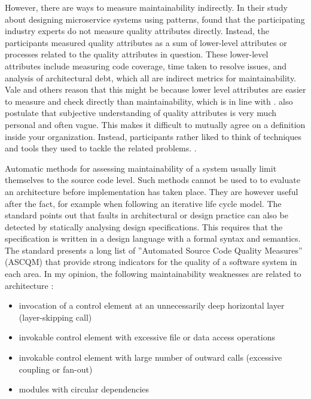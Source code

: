 \documentclass[utf8,english]{gradu3}
\begin{document}
However, there are ways to measure maintainability indirectly. In their study about
designing microservice systems using patterns, \textcite[9]{Vale2022} found that
the participating industry experts do not measure quality attributes directly.
Instead, the participants measured quality attributes as a sum of lower-level attributes or
processes related to the quality attributes in question. These lower-level
attributes include measuring code coverage, time taken to resolve issues, and
analysis of architectural debt, which all are indirect metrics for
maintainability. Vale and others reason that this might be because lower level
attributes are easier to measure and check directly than maintainability, which is 
in line with \textcite{Arvanitou2017}. \textcite[9]{Vale2022}
also postulate that subjective understanding of quality attributes is very much
personal and often vague. This makes it difficult to mutually agree on a
definition inside your organization. Instead, participants rather liked to think
of techniques and tools they used to tackle the related problems.
\parencite[7-10]{Vale2022}.

Automatic methods for assessing maintainability of a system usually limit
themselves to the source code level. Such methods cannot be used to to evaluate
an architecture before implementation has taken place. They are however useful
after the fact, for example when following an iterative life cycle model.
The standard \textcite[1-2]{ISO5055} points out that faults in architectural or design practice
can also be detected by statically analysing design specifications. This
requires that the specification is written in a design language with a formal
syntax and semantics. The standard presents a long list of
''Automated Source Code Quality Measures'' (ASCQM) that provide strong
indicators for the quality of a software system in each area. In my opinion,
the following maintainability weaknesses are related to architecture
\parencite[38-47]{ISO5055}:
\begin{itemize}
  \item invocation of a control element at an unnecessarily deep horizontal
        layer (layer-skipping call)
  \item invokable control element with excessive file or data access operations
  \item invokable control element with large number of outward calls (excessive coupling
        or fan-out)
  \item modules with circular dependencies
\end{itemize}
\end{document}
